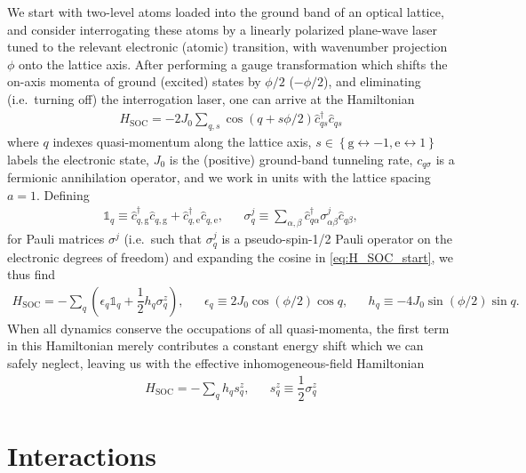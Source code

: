 \documentclass[aps,notitlepage,nofootinbib,11pt]{revtex4-1}
\renewcommand{\t}{\text} %
\newcommand{\f}[2]{\dfrac{#1}{#2}} %
\newcommand{\p}[1]{\left(#1\right)} %
\renewcommand{\set}[1]{\left\{#1\right\}} %
\newcommand{\g}{\text{g}} %
\newcommand{\e}{\text{e}}
\newcommand{\1}{\mathds{1}}
\begin{document}
We start with two-level atoms loaded into the ground band of an
optical lattice, and consider interrogating these atoms by a linearly
polarized plane-wave laser tuned to the relevant electronic (atomic)
transition, with wavenumber projection $\phi$ onto the lattice axis.
After performing a gauge transformation which shifts the on-axis
momenta of ground (excited) states by $\phi/2$ ($-\phi/2$), and
eliminating (i.e.~turning off) the interrogation laser, one can arrive
at the Hamiltonian
\begin{align}
  H_{\t{SOC}}
  = -2J_0\sum_{q,s} \cos\p{q+s\phi/2} \hat c_{qs}^\dag \hat c_{qs}
  \label{eq:H_SOC_start}
\end{align}
where $q$ indexes quasi-momentum along the lattice axis,
$s\in\set{\g\leftrightarrow-1,\e\leftrightarrow1}$ labels the
electronic state, $J_0$ is the (positive) ground-band tunneling rate,
$c_{q\sigma}$ is a fermionic annihilation operator, and we work in
units with the lattice spacing $a=1$.  Defining
\begin{align}
  \1_q \equiv \hat c_{q,\g}^\dag \hat c_{q,\g}
  + \hat c_{q,\e}^\dag \hat c_{q,\e},
  &&
  \sigma_q^j \equiv \sum_{\alpha,\beta}
  \hat c_{q\alpha}^\dag \sigma^j_{\alpha\beta} \hat c_{q\beta},
  \label{eq:pseudospin}
\end{align}
for Pauli matrices $\sigma^j$ (i.e.~such that $\sigma_q^j$ is a
pseudo-spin-1/2 Pauli operator on the electronic degrees of freedom)
and expanding the cosine in \eqref{eq:H_SOC_start}, we thus find
\begin{align}
  H_{\t{SOC}}
  = -\sum_q \p{\epsilon_q \1_q + \f12 h_q \sigma_q^z},
  &&
  \epsilon_q \equiv 2J_0 \cos\p{\phi/2} \cos q,
  &&
  h_q \equiv -4J_0 \sin\p{\phi/2} \sin q.
\end{align}
When all dynamics conserve the occupations of all quasi-momenta, the
first term in this Hamiltonian merely contributes a constant energy
shift which we can safely neglect, leaving us with the effective
inhomogeneous-field Hamiltonian
\begin{align}
  H_{\t{SOC}} = -\sum_q h_q s_q^z,
  &&
  s_q^z \equiv \f12 \sigma_q^z
  \label{eq:H_SOC}
\end{align}


\section{Interactions}
\end{document}

